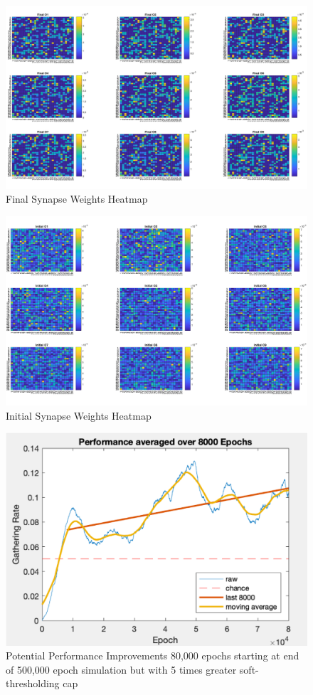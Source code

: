 \documentclass[11pt, twocolumn]{article}
\begin{document}
\begin{figure}[H]
	\centering
	\includegraphics[width=\linewidth]{final_synapse_weights}
	\caption{Final Synapse Weights Heatmap}
	\label{fig:final_synapse_weights}
\end{figure}

\begin{figure}[H]
	\centering
	\includegraphics[width=\linewidth]{initial_synapse_weights}
	\caption{Initial Synapse Weights Heatmap}
	\label{fig:initial_synapse_weights}
\end{figure}

\begin{figure}[H]
	\centering
	\includegraphics[width=\linewidth]{performance_improvements}
	\caption{Potential Performance Improvements 80,000 epochs starting at end of 500,000 epoch simulation but with 5 times greater soft-thresholding cap}
	\label{fig:performance_improvements}
\end{figure}
\end{document}
